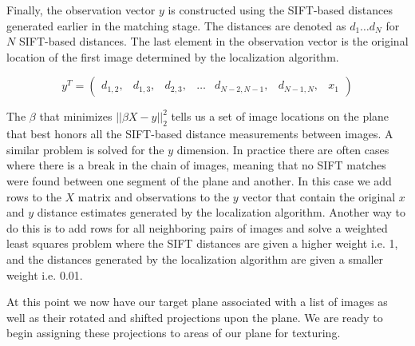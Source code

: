 \documentclass[10pt,twocolumn,letterpaper]{article}
\begin{document}
Finally, the observation vector $y$ is constructed using the SIFT-based distances generated earlier in the matching stage. The distances are denoted as $d_1 \dots d_N$ for $N$ SIFT-based distances. The last element in the observation vector is the original location of the first image determined by the localization algorithm. 

\[
y^T = 
 \begin{pmatrix}
  d_{1,2}, & d_{1,3}, & d_{2,3}, & \hdots & d_{N-2,N-1}, & d_{N-1,N}, &  x_1
 \end{pmatrix}
\]

The $\beta$ that minimizes  $||\beta X - y||_2^2$ tells us a set of image locations on the plane that best honors all the SIFT-based distance measurements between images. A similar problem is solved for the $y$ dimension. In practice there are often cases where there is a break in the chain of images, meaning that no SIFT matches were found between one segment of the plane and another. In this case we add rows to the $X$ matrix and observations to the $y$ vector that contain the original $x$ and $y$ distance estimates generated by the localization algorithm. Another way to do this is to add rows for all neighboring pairs of images and solve a weighted least squares problem where the SIFT distances are given a higher weight i.e. 1, and the distances generated by the localization algorithm are given a smaller weight i.e. 0.01.

At this point we now have our target plane associated with a list of images as well as their rotated and shifted projections upon the plane. We are ready to begin assigning these projections to areas of our plane for texturing.
\end{document}
